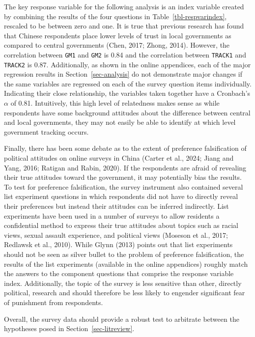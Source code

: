 \documentclass[
  letterpaper,
  DIV=11,
  numbers=noendperiod]{scrartcl}
\begin{document}
The key response variable for the following analysis is an index
variable created by combining the results of the four questions in
Table~\ref{tbl-respvarindex}, rescaled to be between zero and one. It is
true that previous research has found that Chinese respondents place
lower levels of trust in local governments as compared to central
governments (Chen, 2017; Zhong, 2014). However, the correlation between
\texttt{GM1} and \texttt{GM2} is 0.84 and the correlation between
\texttt{TRACK1} and \texttt{TRACK2} is 0.87. Additionally, as shown in
the online appendices, each of the major regression results in
Section~\ref{sec-analysis} do not demonstrate major changes if the same
variables are regressed on each of the survey question items
individually. Indicating their close relationship, the variables taken
together have a Cronbach's \(\alpha\) of 0.81. Intuitively, this high
level of relatedness makes sense as while respondents have some
background attitudes about the difference between central and local
governments, they may not easily be able to identify at which level
government tracking occurs.

Finally, there has been some debate as to the extent of preference
falsification of political attitudes on online surveys in China (Carter
et al., 2024; Jiang and Yang, 2016; Ratigan and Rabin, 2020). If the
respondents are afraid of revealing their true attitudes toward the
government, it may potentially bias the results. To test for preference
falsification, the survey instrument also contained several list
experiment questions in which respondents did not have to directly
reveal their preferences but instead their attitudes can be inferred
indirectly. List experiments have been used in a number of surveys to
allow residents a confidential method to express their true attitudes
about topics such as racial views, sexual assault experience, and
political views (Moseson et al., 2017; Redlawsk et al., 2010). While
Glynn (2013) points out that list experiments should not be seen as
silver bullet to the problem of preference falsification, the results of
the list experiments (available in the online appendices) roughly match
the answers to the component questions that comprise the response
variable index. Additionally, the topic of the survey is less sensitive
than other, directly political, research and should therefore be less
likely to engender significant fear of punishment from respondents.

Overall, the survey data should provide a robust test to arbitrate
between the hypotheses posed in Section~\ref{sec-litreview}.
\end{document}
